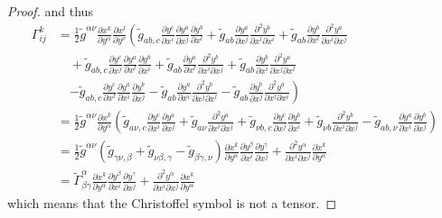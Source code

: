 \begin{enumerate}[label=\arabic{*}.]
\begin{proof}
		and thus
		\begin{equation*}
			\begin{aligned}
				\Gamma^k_{ij} &= \frac{1}{2}\tilde{g}^{\alpha\nu}\frac{\partial x^k}{\partial y^\alpha}\frac{\partial x^l}{\partial y^\nu}\left(\tilde{g}_{ab,c}\frac{\partial y^c}{\partial x^i}\frac{\partial y^a}{\partial x^j}\frac{\partial y^b}{\partial x^l} + \tilde{g}_{ab}\frac{\partial y^a}{\partial x^j}\frac{\partial^2 y^b}{\partial x^l\partial x^i} + \tilde{g}_{ab}\frac{\partial y^b}{\partial x^l}\frac{\partial^2 y^a}{\partial x^i\partial x^j}\right. \\
				&\quad + \tilde{g}_{ab,c}\frac{\partial y^c}{\partial x^j}\frac{\partial y^a}{\partial x^l}\frac{\partial y^b}{\partial x^i} + \tilde{g}_{ab}\frac{\partial y^a}{\partial x^l}\frac{\partial^2 y^b}{\partial x^i\partial x^j} + \tilde{g}_{ab}\frac{\partial y^b}{\partial x^i}\frac{\partial^2 y^a}{\partial x^j\partial x^l} \\
				&\quad\left.-  \tilde{g}_{ab,c}\frac{\partial y^c}{\partial x^l}\frac{\partial y^a}{\partial x^i}\frac{\partial y^b}{\partial x^j} - \tilde{g}_{ab}\frac{\partial y^a}{\partial x^i}\frac{\partial^2 y^b}{\partial x^j\partial x^l} - \tilde{g}_{ab}\frac{\partial y^b}{\partial x^j}\frac{\partial^2 y^a}{\partial x^l\partial x^i} \right) \\
				&= \frac{1}{2}\tilde{g}^{\alpha\nu}\frac{\partial x^k}{\partial y^\alpha}\left(\tilde{g}_{a\nu,c}\frac{\partial y^c}{\partial x^i}\frac{\partial y^a}{\partial x^j} + \tilde{g}_{a\nu}\frac{\partial^2 y^a}{\partial x^i\partial x^j} + \tilde{g}_{\nu b,c}\frac{\partial y^c}{\partial x^j}\frac{\partial y^b}{\partial x^i} +\tilde{g}_{\nu b}\frac{\partial^2 y^b}{\partial x^i\partial x^j} - \tilde{g}_{ab,\nu}\frac{\partial y^a}{\partial x^i}\frac{\partial y^b}{\partial x^j}\right) \\
				&= \frac{1}{2}\tilde{g}^{\alpha\nu}\left(\tilde{g}_{\gamma\nu,\beta} + \tilde{g}_{\nu \beta,\gamma} - \tilde{g}_{\beta\gamma,\nu}\right)\frac{\partial x^k}{\partial y^\alpha}\frac{\partial y^\beta}{\partial x^i}\frac{\partial y^\gamma}{\partial x^j} + \frac{\partial^2 y^\alpha}{\partial x^i\partial x^j}\frac{\partial x^k}{\partial y^\alpha} \\
				&= \tilde{\Gamma}^\alpha_{\beta\gamma}\frac{\partial x^k}{\partial y^\alpha}\frac{\partial y^\beta}{\partial x^i}\frac{\partial y^\gamma}{\partial x^j} + \frac{\partial^2 y^\alpha}{\partial x^i\partial x^j}\frac{\partial x^k}{\partial y^\alpha}
			\end{aligned}
		\end{equation*}
		which means that the Christoffel symbol is not a tensor. 


\end{proof}
\end{enumerate}
